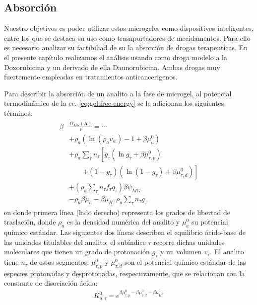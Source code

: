\subsection{Absorci\'on}

Nuestro objetivos es poder utilizar estos microgeles como dispositivos inteligentes, entre los que se destaca su uso como trasnportadores de mecidamentos. Para ello es necesario analizar su factibiliad de su la absorci\'on de drogas terapeuticas. En el presente cap\'itulo realizamos el an\'alisis usando como droga modelo a la Doxorubicina y un derivado de ella Daunorubicina. Ambas drogas muy fuertemente empleadas en tratamientos anticancerigenos. 

Para describir la absorci\'on de un analito a la fase de microgel,
al potencial termodin\'amico de la ec. \ref{eq:gel:free-energy} se le adicionan los siguientes t\'erminos:
%
%
%
\begin{align}
\begin{aligned}
\beta&\frac{\Omega_{MG}(R)}{V}= \cdots\\&+ \rho_a\left(\ln\left(\rho_a v_w\right) -1 + \beta\mu^0_a\right) \\
& + \rho_a \sum_\tau n_\tau  \left[g_\tau(\ln g_\tau+ \beta\mu^0_{\tau,p})\right.\\
&\qquad\left.+(1-g_\tau)(\ln (1-g_\tau)+\beta\mu^0_{\tau, d})\right] \\
& +  \left( \rho_a \sum_\tau n_\tau f_\tau q_\tau\right)\beta\psi_{MG}\\
& -\rho_a\beta\mu_a
 -\beta\mu_{H^+} \rho_a \sum_\tau n_\tau g_\tau
\end{aligned}
\label{eq:gel:ads}
\end{align}
%
\noindent en donde primera l\'inea (lado derecho) representa los grados de libertad de traslaci\'on,
donde $\rho_a$ es la densidad num\'erica del analito y $\mu_a^0$ su potencial qu\'imico est\'andar.
Las siguientes dos l\'ineas describen el equilibrio \'acido-base de las unidades titulables del analito;
el sub\'indice $\tau$ recorre dichas unidades moleculares que tienen un grado de protonaci\'on $g_\tau$ y un volumen $v_\tau$.
El analito tiene $n_\tau$ de estos segmentos;
$\mu^0_{\tau, p}$ y $\mu^0_{\tau,d}$ son el potencial qu\'imico est\'andar de las especies protonadas y desprotonadas, respectivamente, que se relacionan con la constante de disociaci\'on \'acida:
%
\begin{align}
K^0_{a,\tau}= e^{\beta\mu^0_{\tau, p}-\beta\mu^0_{\tau,d}-\beta\mu^0_{H^+}}
\end{align}
%

